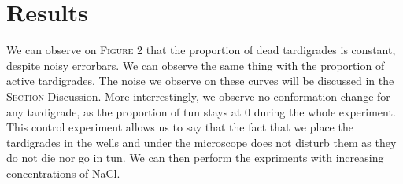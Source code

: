 \documentclass[12pt,a4paper, twocolumn]{article}
\begin{document}
\section{Results}

We can observe on \textsc{Figure} 2 that the proportion of dead tardigrades is constant, despite noisy errorbars. We can observe the same thing with the proportion of active tardigrades. The noise we observe on these curves will be discussed in the \textsc{Section} Discussion. More interrestingly, we observe no conformation change for any tardigrade, as the proportion of tun stays at 0 during the whole experiment.\\
This control experiment allows us to say that the fact that we place the tardigrades in the wells and under the microscope does not disturb them as they do not die nor go in tun. We can then perform the expriments with increasing concentrations of NaCl.\\
\end{document}
